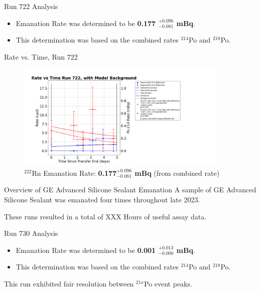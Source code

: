 \documentclass[aspectratio=169]{beamer}
\begin{document}
\begin{frame}{Run 722 Analysis}
    \begin{itemize}
        \item Emanation Rate was determined to be \textbf{0.177 $^{+0.096}_{-0.081}$ mBq}.
        \item This determination was based on the combined rates $^{214}$Po and $^{218}$Po.
    \end{itemize}

    \hyperlink{722_Backup}{}
\end{frame}

\begin{frame}{Rate vs. Time, Run 722}
\label{RvT_722}
    \begin{figure}
        \begin{center}
            \includegraphics[width=0.9\textwidth]
            {assets/722/RvT.png}
            \caption{$^{222}$Rn Emanation Rate: 
            \textbf{0.177$^{+0.096}_{-0.081}$ mBq} (from combined rate)}
        \end{center}
    \end{figure}    
\end{frame}

\begin{frame}{Overview of GE Advanced Silicone Sealant Emanation}
    A sample of GE Advanced Silicone Sealant was emanated four times throughout late 2023.
    
    These runs resulted in a total of XXX Hours of useful assay data.
    

\end{frame}

\begin{frame}{Run 730 Analysis}
    \begin{itemize}
        \item Emanation Rate was determined to be \textbf{0.001 $^{+0.013}_{-0.000}$ mBq}.
        \item This determination was based on the combined rates $^{214}$Po and $^{218}$Po.
    \end{itemize}
    This run exhibited fair resolution between $^{21x}$Po event peaks.

    \hyperlink{730_Backup}{}
\end{frame}
\end{document}
